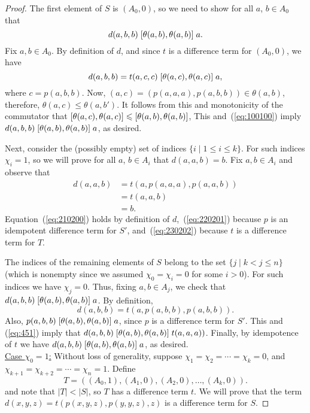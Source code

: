 \begin{proof}
The first element of $S$ is $(A_0, 0)$, so we need to show for all $a$, $b \in A_0$
that
\[
d(a,b,b) \mathrel{[\theta(a,b), \theta(a,b)]} a.
\]
Fix $a, b \in A_0$.
By definition of $d$, and since
$t$ is a \glocal difference term for $(A_0, 0)$, we have
\begin{equation}
  \label{eq:100100}
  d(a,b,b) 
  =t(a, c, c)\comm{\theta(a, c)}{\theta(a, c)} a,
\end{equation}
where $c = p(a,b,b)$.
Now, $(a, c) = (p(a,a,a), p(a,b,b)) \in \theta(a, b)$, therefore,
$\theta(a, c) \leq \theta(a,b')$.
It follows from this and monotonicity of the commutator that
$\mathrel{[\theta(a, c), \theta(a, c)]} {\leqslant} \mathrel{[\theta(a,b), \theta(a,b)]}$,
This and~(\ref{eq:100100}) imply
$d(a,b,b)\mathrel{[\theta(a,b), \theta(a,b)]} a$,
as desired.

Next, consider the (possibly empty) set of indices $\{i \mid 1\leq i \leq k\}$.
For such indices $\chi_i =1$, so we will prove
for all $a$, $b \in A_i$ that $d(a,a,b) = b$.
Fix $a, b \in A_i$ and observe that
\begin{align}
  d(a,a,b) &=
  t(a, p(a,a,a), p(a,a,b)) \label{eq:210200}\\
  &=t(a,a,b) \label{eq:220201}\\
  &=b. \label{eq:230202}
\end{align}
Equation~(\ref{eq:210200}) holds by definition of $d$,~(\ref{eq:220201})
because $p$ is an idempotent \glocal difference term for
$S'$, and~(\ref{eq:230202}) because $t$ is a \glocal difference term for $T$.

The indices of the remaining elements of $S$
belong to the set $\{j \mid k<j\leq n\}$ (which is nonempty since we
assumed $\chi_0 = \chi_i = 0$ for some $i>0$).
For such indices we have $\chi_j = 0$.
Thus, fixing $a, b \in A_j$, we check that
$d(a,b,b)\mathrel{[\theta(a,b), \theta(a,b)]} a$.
By definition,
\begin{equation}
  \label{eq:451}
d(a,b,b) =t(a, p(a,b,b), p(a,b,b)).  
\end{equation}
Also, $p(a,b,b) \mathrel{[\theta(a,b), \theta(a,b)]} a$,
since $p$ is a \glocal difference term for $S'$.
This and (\ref{eq:451}) imply
that
$d(a, b,b) \mathrel{[\theta(a,b), \theta(a,b)]} t(a,a,a))$.
Finally, by idempotence of $t$ we have
$d(a,b,b)\mathrel{[\theta(a,b), \theta(a,b)]} a$,
as desired.
\\[6pt]
\underline{Case $\chi_0 = 1$:}
Without loss of generality, suppose $\chi_1 = \chi_2 =\cdots =\chi_k = 0$,
and $\chi_{k+1} = \chi_{k+2} = \cdots = \chi_{n} = 1$.
Define
\[
T = ((A_0, 1), (A_1, 0), (A_2, 0), \dots, (A_k, 0)).
\]
and note that $|T| < |S|$, so $T$ has a \glocal difference term $t$.
We will prove that the term $d(x,y,z) = t(p(x,y,z), p(y,y,z), z)$
is a \glocal difference term for $S$.


\end{proof}
